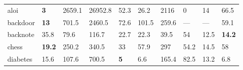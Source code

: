 \begin{table}[ht]
\begin{tabular}{l|llllllll|l}
aloi & \textbf{3} & \tiny{2659.1} & 26952.8 & 52.3 & \tiny{26.2} & 2116 & \tiny{0} & \tiny{14} & 66.5 \\ 
  backdoor & \textbf{13} & 701.5 & 2460.5 & 72.6 & 101.5 & 259.6 & --- & --- & 59.1 \\ 
  backnote & 35.8 & 79.6 & 116.7 & 22.7 & 22.3 & 39.5 & 54 & \tiny{12.5} & \textbf{14.2} \\ 
  chess & \textbf{19.2} & 250.2 & 340.5 & 33 & 57.9 & \tiny{297} & \tiny{54.2} & \tiny{14.5} & 58 \\ 
  diabetes & 15.6 & 107.6 & 700.5 & \textbf{5} & \tiny{6.6} & 165.4 & 82.5 & \tiny{13.2} & 6.8 \\ 

\end{tabular}
\end{table}

